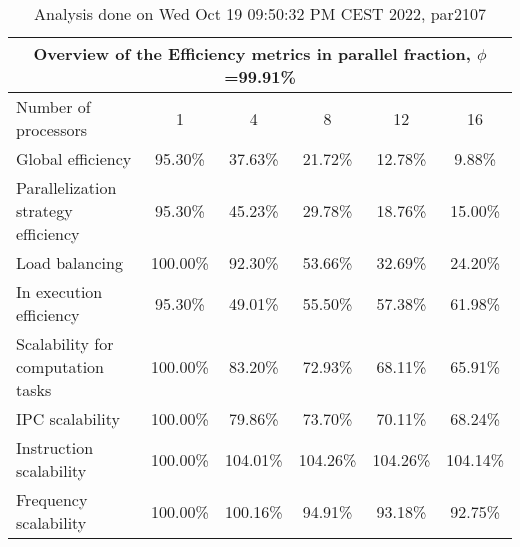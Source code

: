 \begin{table}[h]
\begin{center}
\begin{tabular}{|l|c|c|c|c|c|}
\hline
\multicolumn{6}{|c|}{Overview of the Efficiency metrics in parallel fraction, $\phi$=99.91\%} \\
\hline
\hline
Number of processors & 1 & 4 & 8 & 12 & 16 \\
\hline
\hline
Global efficiency                      &     95.30\% &     37.63\% &     21.72\% &     12.78\% &      9.88\% \\
\hline
\hline
Parallelization strategy efficiency &     95.30\% &     45.23\% &     29.78\% &     18.76\% &     15.00\% \\
\hline
Load balancing                   &    100.00\% &     92.30\% &     53.66\% &     32.69\% &     24.20\% \\
In execution efficiency          &     95.30\% &     49.01\% &     55.50\% &     57.38\% &     61.98\% \\
\hline
\hline
Scalability for computation tasks   &    100.00\% &     83.20\% &     72.93\% &     68.11\% &     65.91\% \\
\hline
IPC scalability                  &    100.00\% &     79.86\% &     73.70\% &     70.11\% &     68.24\% \\
Instruction scalability          &    100.00\% &    104.01\% &    104.26\% &    104.26\% &    104.14\% \\
Frequency scalability            &    100.00\% &    100.16\% &     94.91\% &     93.18\% &     92.75\% \\
\hline
\end{tabular}
\end{center}
\caption{ Analysis done on Wed Oct 19 09:50:32 PM CEST 2022, par2107}
\end{table}
